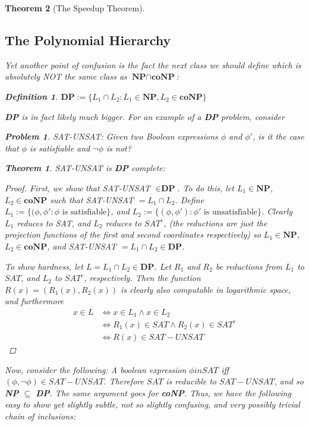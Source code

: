 \documentclass{article}
\theoremstyle{definition}
\newtheorem{definition}{Definition}[section]
\newtheorem{problem}{Problem}
\theoremstyle{plain}
\theoremstyle{theorem}
\newtheorem{theorem}{Theorem}[section]
\begin{document}
\begin{theorem}[The Speedup Theorem]
\subsection{The Polynomial Hierarchy}
\par Yet another point of confusion is the fact the next class we should define which is absolutely NOT the same class as $\textbf{NP} \cap \textbf{coNP}$:
\begin{definition}
    $\textbf{DP} := \{L_1 \cap L_2: L_1 \in \textbf{NP}, L_2 \in \textbf{coNP}\}$
\end{definition}
\textbf{DP} is in fact likely much bigger. For an example of a \textbf{DP} problem, consider
\begin{problem}
    SAT-UNSAT: Given two Boolean expressions $\phi$ and $\phi'$, is it the case that $\phi$ is satisfiable and $\neg\phi$ is not?
\end{problem}
\begin{theorem}
    SAT-UNSAT is \textbf{DP} complete:
\end{theorem}
\begin{proof}
    First, we show that SAT-UNSAT $\in \textbf{DP}$. To do this, let $L_1 \in \textbf{NP}$, $L_2 \in \textbf{coNP}$ such that SAT-UNSAT $= L_1 \cap L_2$. Define $L_1 := \{(\phi,\phi': \phi \textrm{ is satisfiable} \}$, and $L_2 := \{(\phi,\phi'): \phi' \textrm{ is unsatisfiable} \}$. Clearly $L_1$ reduces to SAT, and $L_2$ reduces to $SAT^c$, (the reductions are just the projection functions of the first and second coordinates respectively) so $L_1 \in \textbf{NP}$, $L_2 \in \textbf{coNP}$, and SAT-UNSAT $= L_1 \cap L_2 \in \textbf{DP}$. 
    \par To show hardness, let $L = L_1 \cap L_2 \in \textbf{DP}$. Let $R_1$ and $R_2$ be reductions from $L_1$ to $SAT$, and $L_2$ to $SAT^c$, respectively. Then the function $R(x) = (R_1(x),R_2(x))$ is clearly also computable in logarithmic space, and furthermore 
    \begin{align}
        x \in L &\iff x \in L_1 \wedge x \in L_2 \\
                &\iff R_1(x) \in SAT \wedge R_2(x) \in SAT^c \\
                &\iff R(x) \in SAT-UNSAT
    \end{align}
\end{proof}
Now, consider the following: A boolean expression $\phi in SAT$ iff $(\phi,\neg \phi) \in SAT-UNSAT$. Therefore $SAT$ is reducible to $SAT-UNSAT$, and so \textbf{NP} $\subseteq$ \textbf{DP}. The same argument goes for \textbf{coNP}. Thus, we have the following easy to show yet slightly subtle, not so slightly confusing, and very possibly trivial chain of inclusions:

\end{theorem}
\end{document}
